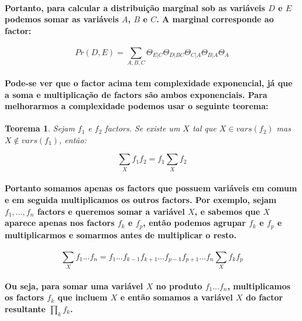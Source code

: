 \documentclass[a4paper,10pt]{article}
\theoremstyle{plain}
\newtheorem*{spn-thm}{Teorema}
\begin{document}
\paragraph{
  Portanto, para calcular a distribuição marginal sob as variáveis $D$ e $E$ podemos somar as
variáveis $A$, $B$ e $C$. A marginal corresponde ao factor:
}

\begin{equation}
  Pr(D, E) = \sum_{A, B, C} \Theta_{E|C} \Theta_{D|BC} \Theta_{C|A} \Theta_{B|A} \Theta_A
\end{equation}

\paragraph{
  Pode-se ver que o factor acima tem complexidade exponencial, já que a soma e multiplicação de
factors são ambos exponenciais. Para melhorarmos a complexidade podemos usar o seguinte teorema:
}

\begin{spn-thm} Sejam $f_1$ e $f_2$ factors. Se existe um $X$ tal que $X \in vars(f_2)$ mas $X 
  \notin vars(f_1)$, então:
  
  \begin{equation}
    \sum_X f_1 f_2 = f_1 \sum_X f_2
  \end{equation}
\end{spn-thm}

\paragraph{
  Portanto somamos apenas os factors que possuem variáveis em comum e em seguida multiplicamos os
outros factors. Por exemplo, sejam $f_1,...,f_n$ factors e queremos somar a variável $X$, e sabemos
que $X$ aparece apenas nos factors $f_k$ e $f_p$, então podemos agrupar $f_k$ e $f_p$ e 
multiplicarmos e somarmos antes de multiplicar o resto.
}

\begin{equation}
  \sum_X f_1 ... f_n = f_1 ... f_{k-1} f_{k+1} ... f_{p-1} f_{p+1} ... f_n \sum_X f_k f_p
\end{equation}

\paragraph{
  Ou seja, para somar uma variável $X$ no produto $f_1...f_n$, multiplicamos os factors $f_k$ que
incluem $X$ e então somamos a variável $X$ do factor resultante $\prod_k f_k$.
}
\end{document}
